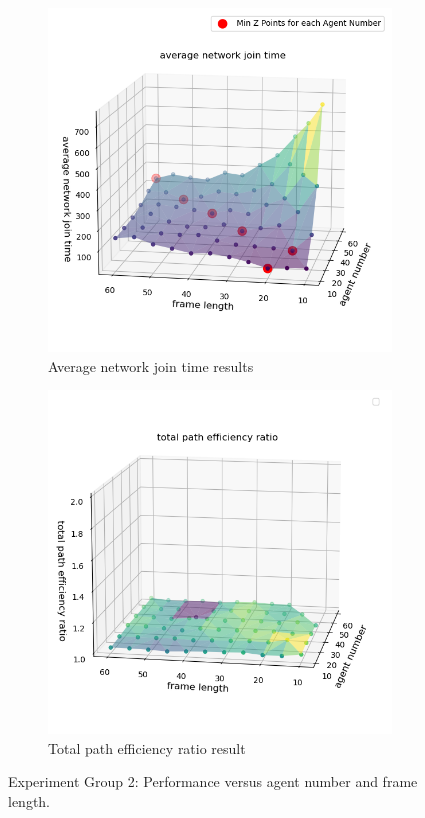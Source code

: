\begin{figure}[htbp]
    \vspace{1cm}
    
    \begin{subfigure}[t]{0.45\linewidth}
        \centering
        \includegraphics[width = \linewidth]{figures/avg_network_join_time.png}
        \caption{Average network join time results}
        \label{fig:Performance3}
    \end{subfigure}
    \hfill
    \begin{subfigure}[t]{0.45\linewidth}
        \centering
        \includegraphics[width = \linewidth]{figures/total_path_effi_ratio.png}
        \caption{Total path efficiency ratio result}
        \label{fig:Performance4}
    \end{subfigure}
    \caption{Experiment Group 2: Performance versus agent number and frame length.}
    \label{fig:Performance}
\end{figure}
